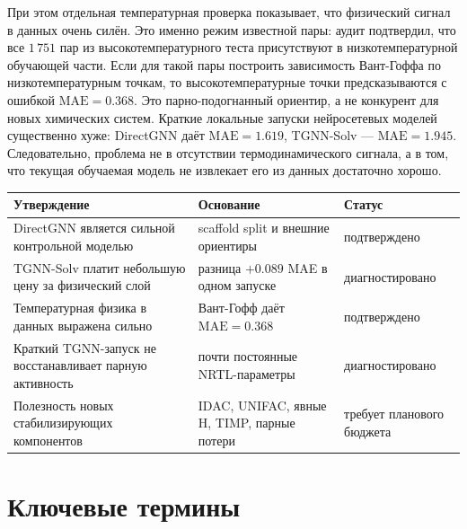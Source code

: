 \documentclass[11pt]{article}
\newcommand{\mae}{\mathrm{MAE}}
\begin{document}
При этом отдельная температурная проверка показывает, что физический сигнал в данных очень силён. Это именно режим известной пары: аудит подтвердил, что все $1\,751$ пар из высокотемпературного теста присутствуют в низкотемпературной обучающей части. Если для такой пары построить зависимость Вант-Гоффа по низкотемпературным точкам, то высокотемпературные точки предсказываются с ошибкой $\mae=0.368$. Это парно-подогнанный ориентир, а не конкурент для новых химических систем. Краткие локальные запуски нейросетевых моделей существенно хуже: DirectGNN даёт $\mae=1.619$, TGNN-Solv --- $\mae=1.945$. Следовательно, проблема не в отсутствии термодинамического сигнала, а в том, что текущая обучаемая модель не извлекает его из данных достаточно хорошо.

\begin{center}
\small
\begin{tabularx}{\textwidth}{P{0.33\textwidth}P{0.32\textwidth}Y}
\toprule
Утверждение & Основание & Статус \\
\midrule
DirectGNN является сильной контрольной моделью & scaffold split и внешние ориентиры & подтверждено \\
TGNN-Solv платит небольшую цену за физический слой & разница $+0.089$ MAE в одном запуске & диагностировано \\
Температурная физика в данных выражена сильно & Вант-Гофф даёт $\mae=0.368$ & подтверждено \\
Краткий TGNN-запуск не восстанавливает парную активность & почти постоянные NRTL-параметры & диагностировано \\
Полезность новых стабилизирующих компонентов & IDAC, UNIFAC, явные H, TIMP, парные потери & требует планового бюджета \\
\bottomrule
\end{tabularx}
\end{center}


\section{Ключевые термины}
\end{document}
